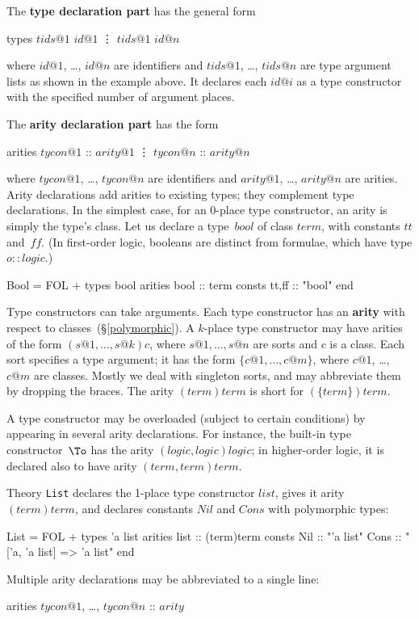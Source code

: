 The {\bf type declaration part} has the general form
\begin{ttbox}
types   \(tids@1\) \(id@1\)
        \vdots
        \(tids@1\) \(id@n\)
\end{ttbox}
where $id@1$, \ldots, $id@n$ are identifiers and $tids@1$, \ldots, $tids@n$
are type argument lists as shown in the example above.  It declares each
$id@i$ as a type constructor with the specified number of argument places.

The {\bf arity declaration part} has the form
\begin{ttbox}
arities \(tycon@1\) :: \(arity@1\)
        \vdots
        \(tycon@n\) :: \(arity@n\)
\end{ttbox}
where $tycon@1$, \ldots, $tycon@n$ are identifiers and $arity@1$, \ldots,
$arity@n$ are arities.  Arity declarations add arities to existing
types; they complement type declarations.
In the simplest case, for an 0-place type constructor, an arity is simply
the type's class.  Let us declare a type~$bool$ of class $term$, with
constants $tt$ and~$ff$.  (In first-order logic, booleans are
distinct from formulae, which have type $o::logic$.)
\begin{ttbox}
Bool = FOL +
types   bool
arities bool    :: term
consts  tt,ff   :: "bool"
end
\end{ttbox}
Type constructors can take arguments.  Each type constructor has an {\bf
  arity} with respect to classes~(\S\ref{polymorphic}).  A $k$-place type
constructor may have arities of the form $(s@1,\ldots,s@k)c$, where
$s@1,\ldots,s@n$ are sorts and $c$ is a class.  Each sort specifies a type
argument; it has the form $\{c@1,\ldots,c@m\}$, where $c@1$, \dots,~$c@m$
are classes.  Mostly we deal with singleton sorts, and may abbreviate them
by dropping the braces.  The arity $(term)term$ is short for
$(\{term\})term$.

A type constructor may be overloaded (subject to certain conditions) by
appearing in several arity declarations.  For instance, the built-in type
constructor~$\To$ has the arity $(logic,logic)logic$; in higher-order
logic, it is declared also to have arity $(term,term)term$.

Theory {\tt List} declares the 1-place type constructor $list$, gives
it arity $(term)term$, and declares constants $Nil$ and $Cons$ with
polymorphic types:
\begin{ttbox}
List = FOL +
types   'a list
arities list    :: (term)term
consts  Nil     :: "'a list"
        Cons    :: "['a, 'a list] => 'a list" 
end
\end{ttbox}
Multiple arity declarations may be abbreviated to a single line:
\begin{ttbox}
arities \(tycon@1\), \ldots, \(tycon@n\) :: \(arity\)
\end{ttbox}

